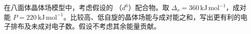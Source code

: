 在八面体晶体场模型中，考虑假设的 （$d^6$）配合物。取 $\Delta_o=360\,\mathrm{kJ\,mol^{-1}}$，成对能 $P=220\,\mathrm{kJ\,mol^{-1}}$。比较高、低自旋的晶体场能与成对能之和，写出更有利的电子排布及未成对电子数。假设不考虑其余能量贡献。
